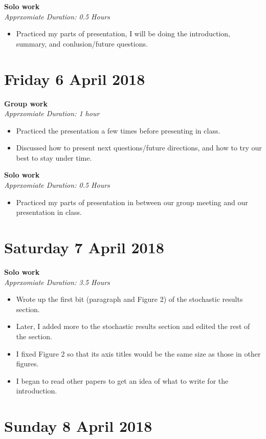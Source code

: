 \documentclass[12pt]{article}\usepackage[]{graphicx}\usepackage[]{color}
\begin{document}
\textbf{Solo work} \\
\emph{Apprxomiate Duration: 0.5 Hours}
\begin{itemize}
\item Practiced my parts of presentation, I will be doing the introduction, summary, and conlusion/future questions.
\end{itemize}

\section*{Friday 6 April 2018}

\textbf{Group work} \\
\emph{Apprxomiate Duration: 1 hour}
\begin{itemize}
\item Practiced the presentation a few times before presenting in class.
\item Discussed how to present next questions/future directions, and how to try our best to stay under time.
\end{itemize}

\textbf{Solo work} \\
\emph{Apprxomiate Duration: 0.5 Hours}
\begin{itemize}
\item Practiced my parts of presentation in between our group meeting and our presentation in class.
\end{itemize}

\section*{Saturday 7 April 2018}

\textbf{Solo work} \\
\emph{Apprxomiate Duration: 3.5 Hours}
\begin{itemize}
\item Wrote up the first bit (paragraph and Figure 2) of the stochastic results section.
\item Later, I added more to the stochastic results section and edited the rest of the section.
\item I fixed Figure 2 so that its axis titles would be the same size as those in other figures.
\item I began to read other papers to get an idea of what to write for the introduction.
\end{itemize}

\section*{Sunday 8 April 2018}
\end{document}
